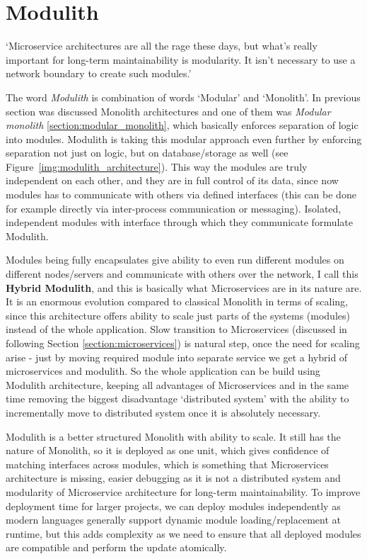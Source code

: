 \section{Modulith}
\label{section:modulith}
`Microservice architectures are all the rage these days, but what's really important for long-term maintainability is modularity. It isn't necessary to use a network boundary to create such modules.' \cite{HOW_TO_BUILD_MODULAR_MONOLITH_CONFERENCE_INTRO}

The word \textit{Modulith} is combination of words `Modular' and `Monolith'. In previous section was discussed Monolith architectures and one of them was \textit{Modular monolith} \ref{section:modular_monolith}, which basically enforces separation of logic into modules. Modulith is taking this modular approach even further by enforcing separation not just on logic, but on database/storage as well (see Figure~\ref{img:modulith_architecture}). This way the modules are truly independent on each other, and they are in full control of its data, since now modules has to communicate with others via defined interfaces (this can be done for example directly via inter-process communication or messaging). Isolated, independent modules with interface through which they communicate formulate Modulith.

Modules being fully encapsulates give ability to even run different modules on different nodes/servers and communicate with others over the network, I call this \textbf{Hybrid Modulith}, and this is basically what Microservices are in its nature are. It is an enormous evolution compared to classical Monolith in terms of scaling, since this architecture offers ability to scale just parts of the systems (modules) instead of the whole application. Slow transition to Microservices (discussed in following Section \ref{section:microservices}) is natural step, once the need for scaling arise - just by moving required module into separate service we get a hybrid of microservices and modulith. So the whole application can be build using Modulith architecture, keeping all advantages of Microservices and in the same time removing the biggest disadvantage `distributed system' with the ability to incrementally move to distributed system once it is absolutely necessary.

Modulith is a better structured Monolith with ability to scale. It still has the nature of Monolith, so it is deployed as one unit, which gives confidence of matching interfaces across modules, which is something that Microservices architecture is missing, easier debugging as it is not a distributed system and modularity of Microservice architecture for long-term maintainability. To improve deployment time for larger projects, we can deploy modules independently as modern languages generally support dynamic module loading/replacement at runtime, but this adds complexity as we need to ensure that all deployed modules are compatible and perform the update atomically. 

